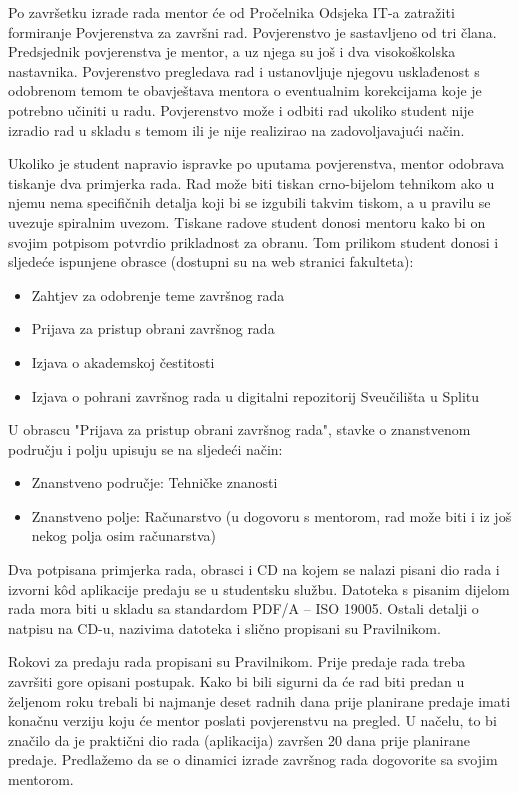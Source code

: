 Po završetku izrade rada mentor će od Pročelnika Odsjeka IT-a zatražiti formiranje Povjerenstva za završni rad. Povjerenstvo je sastavljeno od tri člana. Predsjednik povjerenstva je mentor, a uz njega su još i dva visokoškolska nastavnika. Povjerenstvo pregledava rad i ustanovljuje njegovu usklađenost s odobrenom temom te obavještava mentora o eventualnim korekcijama koje je potrebno učiniti u radu. Povjerenstvo može i odbiti rad ukoliko student nije izradio rad u skladu s temom ili je nije realizirao na zadovoljavajući način.

Ukoliko je student napravio ispravke po uputama povjerenstva, mentor odobrava tiskanje dva primjerka rada. Rad može biti tiskan crno-bijelom tehnikom ako u njemu nema specifičnih detalja koji bi se izgubili takvim tiskom, a u pravilu se uvezuje spiralnim uvezom. Tiskane radove student donosi mentoru kako bi on svojim potpisom potvrdio prikladnost za obranu. Tom prilikom  student donosi i sljedeće ispunjene obrasce (dostupni su na web stranici fakulteta):

\begin{itemize}
	\item Zahtjev za odobrenje teme završnog rada
	\item Prijava za pristup obrani završnog rada
	\item Izjava o akademskoj čestitosti
	\item Izjava o pohrani završnog rada u digitalni repozitorij Sveučilišta u Splitu 
\end{itemize}

U obrascu "Prijava za pristup obrani završnog rada", stavke o znanstvenom području i polju upisuju se na sljedeći način:
\begin{itemize}
	\item Znanstveno područje: Tehničke znanosti
	\item Znanstveno polje: Računarstvo (u dogovoru s mentorom, rad može biti i iz još nekog polja osim računarstva)
\end{itemize}

Dva potpisana primjerka rada, obrasci i CD na kojem se nalazi pisani dio rada i izvorni k\^od aplikacije predaju se u studentsku službu. Datoteka s pisanim dijelom rada mora biti u skladu sa standardom PDF/A – ISO 19005. Ostali detalji o natpisu na CD-u, nazivima datoteka i slično propisani su Pravilnikom.

Rokovi za predaju rada propisani su Pravilnikom. Prije predaje rada treba završiti gore opisani postupak. Kako bi bili sigurni da će rad biti predan u željenom roku trebali bi najmanje deset radnih dana prije planirane predaje imati konačnu verziju koju će mentor poslati povjerenstvu na pregled. U načelu, to bi značilo da je praktični dio rada (aplikacija) završen 20 dana prije planirane predaje. Predlažemo da se o dinamici izrade završnog rada dogovorite sa svojim  mentorom.

